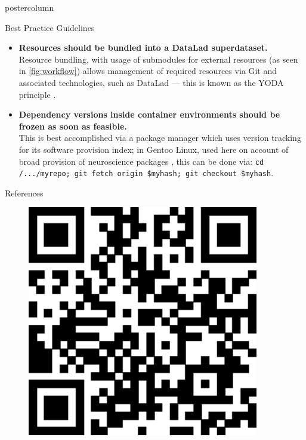 \begin{frame}
\begin{columns}
\begin{column}{.42\textwidth}
\begin{beamercolorbox}[center]{postercolumn}
\begin{minipage}{.98\textwidth}
{\begin{myblock}{Best Practice Guidelines}
\begin{itemize}
							\item \textbf{Resources should be bundled into a DataLad superdataset.}\\
								Resource bundling, with usage of submodules for external resources (as seen in \cref{fig:workflow}) allows management of required resources via Git and associated technologies, such as DataLad \cite{datalad} — this is known as the YODA principle \cite{yoda}.
							\item \textbf{Dependency versions inside container environments should be frozen as soon as feasible.}\\
								This is best accomplished via a package manager which uses version tracking for its software provision index; in Gentoo Linux, used here on account of broad provision of neuroscience packages \cite{ng}, this can be done via: \colorbox{elg}{\texttt{cd /.../myrepo; git fetch origin \$myhash; git checkout \$myhash}}.
						\end{itemize}
					\end{myblock}\vfill
					\begin{myblock}{References}
						\vspace{0.5em}
						\begin{minipage}{.3\textwidth}
							\begin{figure}
								\includegraphics[width=0.9\textwidth]{img/qr.eps}

\end{figure}
\end{minipage}
\end{myblock}}
\end{minipage}
\end{beamercolorbox}
\end{column}
\end{columns}
\end{frame}
